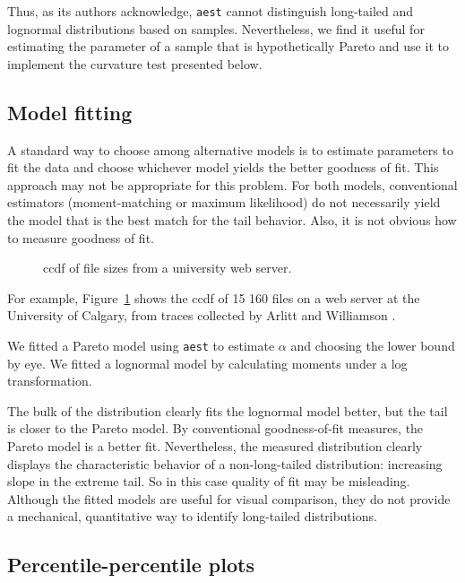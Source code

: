 \documentclass{elsart}
\begin{document}
Thus, as its authors acknowledge, \texttt{aest} cannot distinguish
long-tailed and lognormal distributions based on samples.
Nevertheless, we find it useful for estimating the parameter of a
sample that is hypothetically Pareto and use it to implement the
curvature test presented below.


\subsection {Model fitting}

A standard way to choose among alternative models is to estimate
parameters to fit the data and choose whichever model yields the
better goodness of fit.
This approach may not be appropriate for this problem.  For both
models, conventional estimators (moment-matching or maximum
likelihood) do not necessarily yield the model that is the best match
for the tail behavior.  Also, it is not obvious how to measure
goodness of fit.

\begin{figure}[tb]
\centerline{}
\caption{ccdf of file sizes from a university web server.}
\label{fig.calgary}
\end{figure}

For example, Figure~\ref{fig.calgary} shows the ccdf of 15 160
files on a web server at the University of Calgary, from traces
collected by Arlitt and Williamson \cite{ArlittWilliamson96}.

We fitted a Pareto model using \texttt{aest} to estimate $\alpha$
and choosing the lower bound by eye.  We fitted a lognormal model by
calculating moments under a log transformation.

The bulk of the distribution clearly fits the lognormal model better,
but the tail is closer to the Pareto model.  By conventional
goodness-of-fit measures, the Pareto model is a better fit.
Nevertheless, the measured distribution clearly displays the
characteristic behavior of a non-long-tailed distribution: increasing
slope in the extreme tail.  So in this case quality of fit may be
misleading.  Although the fitted models are useful for visual
comparison, they do not provide a mechanical, quantitative way to
identify long-tailed distributions.


\subsection {Percentile-percentile plots}
\end{document}
